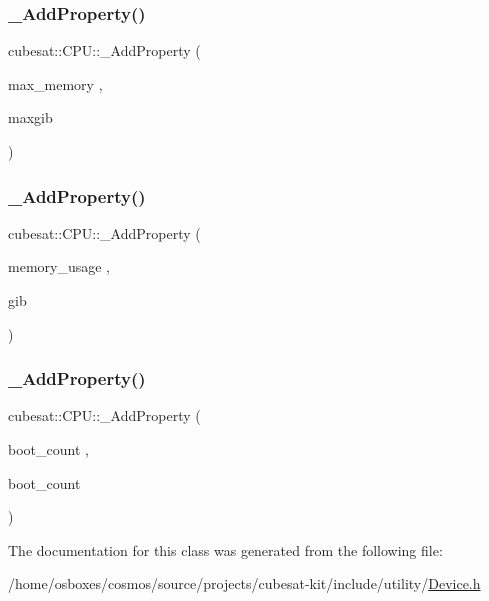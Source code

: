 \mbox{\label{classcubesat_1_1CPU_afdfc978336cfe4b2390d7f2520041761}} 
\subsubsection{\texorpdfstring{\+\_\+\+Add\+Property()}{\_AddProperty()}\hspace{0.1cm}{\footnotesize\ttfamily [10/12]}}
{\footnotesize\ttfamily cubesat\+::\+C\+P\+U\+::\+\_\+\+Add\+Property (\begin{DoxyParamCaption}\item[{max\+\_\+memory}]{,  }\item[{maxgib}]{ }\end{DoxyParamCaption})}

\mbox{\label{classcubesat_1_1CPU_a087450dc4ceb02b01420e5a3b894bc95}} 
\subsubsection{\texorpdfstring{\+\_\+\+Add\+Property()}{\_AddProperty()}\hspace{0.1cm}{\footnotesize\ttfamily [11/12]}}
{\footnotesize\ttfamily cubesat\+::\+C\+P\+U\+::\+\_\+\+Add\+Property (\begin{DoxyParamCaption}\item[{memory\+\_\+usage}]{,  }\item[{gib}]{ }\end{DoxyParamCaption})}

\mbox{\label{classcubesat_1_1CPU_a478fa66d93190e603a0ebfde468a2fb4}} 
\subsubsection{\texorpdfstring{\+\_\+\+Add\+Property()}{\_AddProperty()}\hspace{0.1cm}{\footnotesize\ttfamily [12/12]}}
{\footnotesize\ttfamily cubesat\+::\+C\+P\+U\+::\+\_\+\+Add\+Property (\begin{DoxyParamCaption}\item[{boot\+\_\+count}]{,  }\item[{boot\+\_\+count}]{ }\end{DoxyParamCaption})}



The documentation for this class was generated from the following file\+:\begin{DoxyCompactItemize}
\item 
/home/osboxes/cosmos/source/projects/cubesat-\/kit/include/utility/\hyperlink{Device_8h}{Device.\+h}\end{DoxyCompactItemize}
